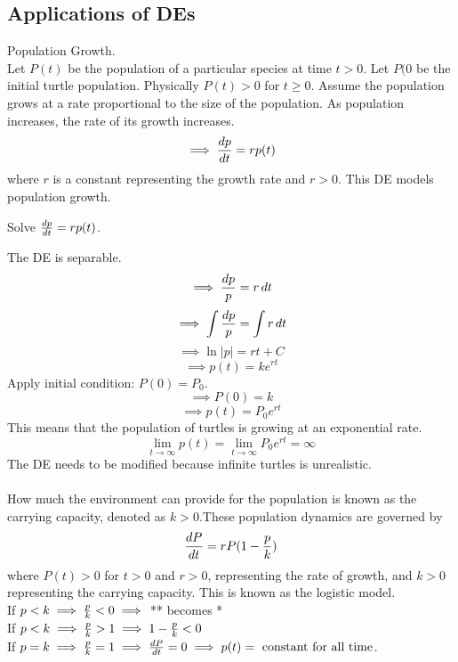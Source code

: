 \documentclass[english, 12pt]{article}
\begin{document}
\subsection{Applications of DEs}
Population Growth. \\
Let $P(t)$ be the population of a particular species at time $t > 0$. Let $P(0$ be the initial turtle population. Physically $P(t) > 0$ for $t \geq 0$. Assume the population grows at a rate proportional to the size of the population. As population increases, the rate of its growth increases.
\[ \implies \frac{dp}{dt} = rp(t) \]
where $r$ is a constant representing the growth rate and $r > 0$. This DE models population growth.
\begin{exmp}
Solve $\frac{dp}{dt} = rp(t)$. 
\begin{sol}
The DE is separable.
\[ \implies \frac{dp}{p} = r\,dt \]
\[ \implies \int \frac{dp}{p} = \int r\,dt \]
\[ \implies \ln | p| = rt + C \]
\[ \implies p(t) = k e^{rt} \]
Apply initial condition: $P(0) = P_{0}$.
\[ \implies P(0) = k \]
\[\implies p(t) = P_{0}e^{rt} \]
This means that the population of turtles is growing at an exponential rate. 
\[ \lim_{t \to \infty} p(t) = \lim_{t\to\infty} P_{0} e^{rt} = \infty \]
The DE needs to be modified because infinite turtles is unrealistic.\\\\
How much the environment can provide for  the population is known as the carrying capacity, denoted as $k > 0$.These population dynamics are governed by 
\[ \frac{dP}{dt} = rP(1-\frac{p}{k}) \]
where $P(t) > 0$ for $t > 0$ and $r > 0$, representing the rate of growth, and $k > 0$ representing the carrying capacity. This is known as the logistic model.\\
If $p< k \implies \frac{p}{k} < 0 \implies$ ** becomes *\\
If $p < k \implies \frac{p}{k} > 1 \implies 1 - \frac{p}{k} < 0$\\
If $p = k \implies \frac{p}{k} = 1 \implies \frac{dP}{dt} = 0 \implies p(t) = \text{ constant for all time}$.
\end{sol}
\end{exmp}
\end{document}
